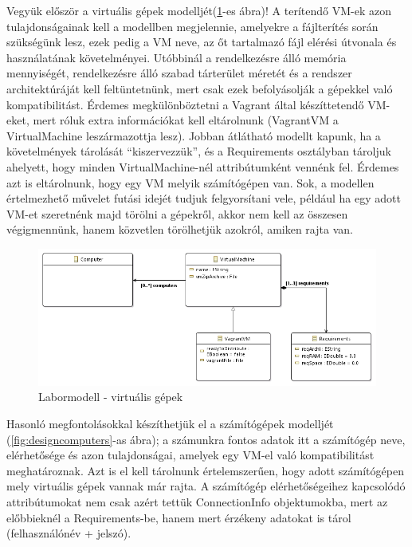 Vegyük először a virtuális gépek modelljét(\ref{fig:designvm}-es ábra)! A terítendő VM-ek azon tulajdonságainak kell a modellben megjelennie, amelyekre a fájlterítés során szükségünk lesz, ezek pedig a VM neve, az őt tartalmazó fájl elérési útvonala és használatának követelményei. Utóbbinál a rendelkezésre álló memória mennyiségét, rendelkezésre álló szabad tárterület méretét és a rendszer architektúráját kell feltüntetnünk, mert csak ezek befolyásolják a gépekkel való kompatibilitást. Érdemes megkülönböztetni a Vagrant által készíttetendő VM-eket, mert róluk extra információkat kell eltárolnunk (VagrantVM a VirtualMachine leszármazottja lesz). Jobban átlátható modellt kapunk, ha a követelmények tárolását ``kiszervezzük'', és a Requirements osztályban tároljuk ahelyett, hogy minden VirtualMachine-nél attribútumként vennénk fel. Érdemes azt is eltárolnunk, hogy egy VM melyik számítógépen van. Sok, a modellen értelmezhető művelet futási idejét tudjuk felgyorsítani vele, például ha egy adott VM-et szeretnénk majd törölni a gépekről, akkor nem kell az összesen végigmennünk, hanem közvetlen törölhetjük azokról, amiken rajta van.

\vspace{0.5cm}

\begin{figure}[ht]
	\centering
	\includegraphics[width=130mm, keepaspectratio]{figures/design_vm.png}
	\caption{Labormodell - virtuális gépek}
	\label{fig:designvm}
\end{figure}

\vspace{0.5cm}

Hasonló megfontolásokkal készíthetjük el a számítógépek modelljét (\ref{fig:designcomputers}-as ábra); a számunkra fontos adatok itt a számítógép neve, elérhetősége és azon tulajdonságai, amelyek egy VM-el való kompatibilitást meghatároznak. Azt is el kell tárolnunk értelemszerűen, hogy adott számítógépen mely virtuális gépek vannak már rajta. A számítógép elérhetőségeihez kapcsolódó attribútumokat nem csak azért tettük ConnectionInfo objektumokba, mert az előbbieknél a Requirements-be, hanem mert érzékeny adatokat is tárol (felhasználónév + jelszó).

